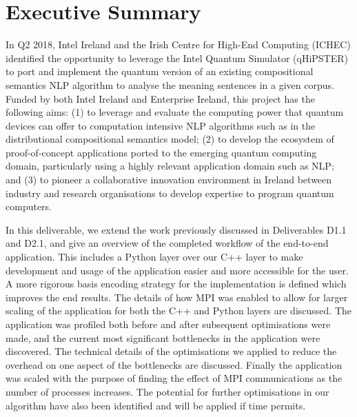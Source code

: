 \documentclass[11pt]{article}
\begin{document}
\section*{Executive Summary}

In Q2 2018, Intel Ireland and the Irish Centre for High-End Computing (ICHEC) identified the opportunity to leverage the Intel Quantum Simulator (qHiPSTER) to port and implement the quantum version of an existing compositional semantics NLP algorithm to analyse the meaning sentences in a given corpus. Funded by both Intel Ireland and Enterprise Ireland, this project has the following aims: (1) to leverage and evaluate the computing power that quantum devices can offer to computation intensive NLP algorithms such as in the distributional compositional semantics model; (2) to develop the ecosystem of proof-of-concept applications ported to the emerging quantum computing domain, particularly using a highly relevant application domain such as NLP; and (3) to pioneer a collaborative innovation environment in Ireland between industry and research organisations to develop expertise to program quantum computers.

In this deliverable, we extend the work previously discussed in Deliverables D1.1 and D2.1, and give an overview of the completed workflow of the end-to-end application. This includes a Python layer over our C++ layer to make development and usage of the application easier and more accessible for the user. A more rigorous basis encoding strategy for the implementation is defined which improves the end results. The details of how MPI was enabled to allow for larger scaling of the application for both the C++ and Python layers are discussed. The application was profiled both before and after subsequent optimisations were made, and the current most significant bottlenecks in the application were discovered. The technical details of the optimisations we applied to reduce the overhead on one aspect of the bottlenecks are discussed. Finally the application was scaled with the purpose of finding the effect of MPI communications as the number of processes increases. The potential for further optimisations in our algorithm have also been identified and will be applied if time permits.




\newpage
\tableofcontents
\newpage
\listoffigures
\listoftables
\end{document}
